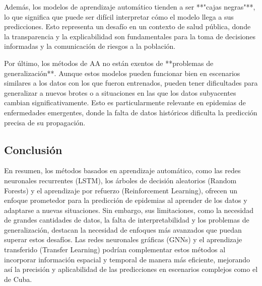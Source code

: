Además, los modelos de aprendizaje automático tienden a ser **"cajas negras"**, lo que significa que puede ser difícil interpretar cómo el modelo llega a sus predicciones. Esto representa un desafío en un contexto de salud pública, donde la transparencia y la explicabilidad son fundamentales para la toma de decisiones informadas y la comunicación de riesgos a la población.

Por último, los métodos de AA no están exentos de **problemas de generalización**. Aunque estos modelos pueden funcionar bien en escenarios similares a los datos con los que fueron entrenados, pueden tener dificultades para generalizar a nuevos brotes o a situaciones en las que los datos subyacentes cambian significativamente. Esto es particularmente relevante en epidemias de enfermedades emergentes, donde la falta de datos históricos dificulta la predicción precisa de su propagación.

\subsection{Conclusión}

En resumen, los métodos basados en aprendizaje automático, como las redes neuronales recurrentes (LSTM), los árboles de decisión aleatorios (Random Forests) y el aprendizaje por refuerzo (Reinforcement Learning), ofrecen un enfoque prometedor para la predicción de epidemias al aprender de los datos y adaptarse a nuevas situaciones. Sin embargo, sus limitaciones, como la necesidad de grandes cantidades de datos, la falta de interpretabilidad y los problemas de generalización, destacan la necesidad de enfoques más avanzados que puedan superar estos desafíos. Las redes neuronales gráficas (GNNs) y el aprendizaje transferido (Transfer Learning) podrían complementar estos métodos al incorporar información espacial y temporal de manera más eficiente, mejorando así la precisión y aplicabilidad de las predicciones en escenarios complejos como el de Cuba.
